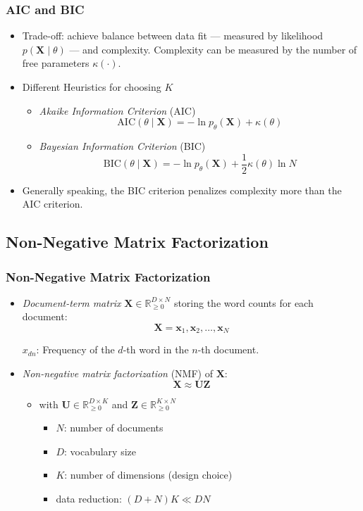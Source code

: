 \documentclass[11pt,a4paper,technote]{IEEEtran}
\newcommand{\matr}[1]{\boldsymbol{\mathbf{#1}}}
\newcommand{\vect}[1]{\boldsymbol{\mathbf{#1}}}
\newcommand{\R}{\mathbb{R}}
\begin{document}
\subsubsection*{AIC and BIC}
\begin{itemize}
  \item Trade-off: achieve balance between data fit --- measured by likelihood
    $p(\matr{X}\mid\theta)$ --- and complexity. Complexity can be measured by
    the number of free parameters $\kappa(\cdot)$.
  \item Different Heuristics for choosing $K$
    \begin{itemize}
      \item \emph{Akaike Information Criterion} (AIC)
        \[
          \mathrm{AIC}(\theta\mid\matr{X}) = -\ln p_{\theta}(\matr{X}) +
          \kappa(\theta)
        \]
      \item \emph{Bayesian Information Criterion} (BIC)
        \[
          \mathrm{BIC}(\theta\mid\matr{X}) = -\ln p_{\theta}(\matr{X}) +
          \frac{1}{2} \kappa(\theta) \ln N
        \]
    \end{itemize}
  \item Generally speaking, the BIC criterion penalizes complexity more than
    the AIC criterion.
\end{itemize}

\subsection*{Non-Negative Matrix Factorization}
\subsubsection*{Non-Negative Matrix Factorization}
\begin{itemize}
  \item \emph{Document-term matrix} $\matr{X} \in \R_{\geq 0}^{D \times N}$
    storing the word counts for each document:
    \[ \matr{X} = \vect{x}_1, \vect{x}_2, \ldots, \vect{x}_N \]

    $x_{dn}$: Frequency of the $d$-th word in the $n$-th document.

  \item \emph{Non-negative matrix factorization} (NMF) of $\matr{X}$:
    \[ \matr{X} \approx \matr{U}\matr{Z} \]
    \begin{itemize}
      \item with $\matr{U} \in \R_{\geq 0}^{D \times K}$ and $\matr{Z} \in
        \R_{\geq 0}^{K \times N}$
        \begin{itemize}
          \item $N$: number of documents
          \item $D$: vocabulary size
          \item $K$: number of dimensions (design choice)
          \item data reduction: $(D+N)K \ll DN$
        \end{itemize}
    \end{itemize}
\end{itemize}
\end{document}
